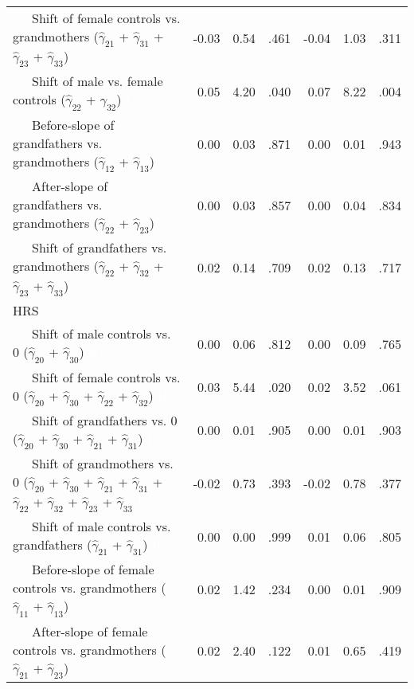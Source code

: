\documentclass[
  english,
  man, noextraspace]{apa7}
\newenvironment{lltable}{\begin{landscape}\begin{center}\begin{ThreePartTable}}{\end{ThreePartTable}\end{center}\end{landscape}}
\begin{document}
\begin{appendix}
\begin{lltable}
{\begin{longtable}{lrrrrrr}
\ \ \ Shift of female controls vs. grandmothers 
($\hat{\gamma}_{21}$ + $\hat{\gamma}_{31}$ + 
$\hat{\gamma}_{23}$ + $\hat{\gamma}_{33}$) \textcolor{white}{L} & -0.03 & 0.54 & .461 & -0.04 & 1.03 & .311\\
\ \ \ Shift of male vs. female controls 
($\hat{\gamma}_{22}$ + $\hat{\gamma}_{32}$) \textcolor{white}{L} & 0.05 & 4.20 & .040 & 0.07 & 8.22 & .004\\
\ \ \ Before-slope of grandfathers vs. grandmothers 
($\hat{\gamma}_{12}$ + $\hat{\gamma}_{13}$) \textcolor{white}{L} & 0.00 & 0.03 & .871 & 0.00 & 0.01 & .943\\
\ \ \ After-slope of grandfathers vs. grandmothers 
($\hat{\gamma}_{22}$ + $\hat{\gamma}_{23}$) \textcolor{white}{L} & 0.00 & 0.03 & .857 & 0.00 & 0.04 & .834\\
\ \ \ Shift of grandfathers vs. grandmothers 
($\hat{\gamma}_{22}$ + $\hat{\gamma}_{32}$ + 
$\hat{\gamma}_{23}$ + $\hat{\gamma}_{33}$) \textcolor{white}{L} & 0.02 & 0.14 & .709 & 0.02 & 0.13 & .717\\
HRS &  &  &  &  &  & \\
\ \ \ Shift of male controls vs. 0 ($\hat{\gamma}_{20}$ + 
$\hat{\gamma}_{30}$) \textcolor{white}{H} & 0.00 & 0.06 & .812 & 0.00 & 0.09 & .765\\
\ \ \ Shift of female controls vs. 0 ($\hat{\gamma}_{20}$ + 
$\hat{\gamma}_{30}$ + $\hat{\gamma}_{22}$ + 
$\hat{\gamma}_{32}$) \textcolor{white}{H} & 0.03 & 5.44 & .020 & 0.02 & 3.52 & .061\\
\ \ \ Shift of grandfathers vs. 0 ($\hat{\gamma}_{20}$ + 
$\hat{\gamma}_{30}$ + $\hat{\gamma}_{21}$ + 
$\hat{\gamma}_{31}$) \textcolor{white}{H} & 0.00 & 0.01 & .905 & 0.00 & 0.01 & .903\\
\ \ \ Shift of grandmothers vs. 0 ($\hat{\gamma}_{20}$ + 
$\hat{\gamma}_{30}$ + $\hat{\gamma}_{21}$ + 
$\hat{\gamma}_{31}$ + $\hat{\gamma}_{22}$ + 
$\hat{\gamma}_{32}$ + $\hat{\gamma}_{23}$ +
$\hat{\gamma}_{33}$ \textcolor{white}{H} & -0.02 & 0.73 & .393 & -0.02 & 0.78 & .377\\
\ \ \ Shift of male controls vs. grandfathers 
($\hat{\gamma}_{21}$ + $\hat{\gamma}_{31}$) \textcolor{white}{H} & 0.00 & 0.00 & .999 & 0.01 & 0.06 & .805\\
\ \ \ Before-slope of female controls vs. grandmothers 
($\hat{\gamma}_{11}$ + $\hat{\gamma}_{13}$) \textcolor{white}{H} & 0.02 & 1.42 & .234 & 0.00 & 0.01 & .909\\
\ \ \ After-slope of female controls vs. grandmothers 
($\hat{\gamma}_{21}$ + $\hat{\gamma}_{23}$) \textcolor{white}{H} & 0.02 & 2.40 & .122 & 0.01 & 0.65 & .419\\

\end{longtable}}
\end{lltable}
\end{appendix}
\end{document}
